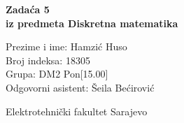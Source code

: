 \documentclass[12pt]{article}
\newcommand{\prezimeIme}{Hamzić Huso}
\newcommand{\brIndexa}{18305}
\newcommand{\brZadace}{5}
\newcommand{\grupa}{DM2 Pon[15.00]}
\newcommand{\demos}{Šeila Bećirović}
\begin{document}
    
    \thispagestyle{empty}
    \begin{center}
      \vspace*{1cm}

      \vspace*{2cm}
      {\huge \bf Zadaća \brZadace } \\
      \vspace*{1cm}
      {\Large \bf iz predmeta Diskretna matematika}

      \vspace*{2cm}

      {\Large Prezime i ime: \prezimeIme} \\
      \vspace*{0.75cm}
      {\Large Broj indeksa: \brIndexa} \\
      \vspace*{0.75cm}
      {\Large Grupa: \grupa} \\
      \vspace*{0.75cm}
      {\Large Odgovorni asistent: \demos} \\
      \vspace*{2cm}
      \renewcommand{\arraystretch}{1.75}
      \vfill


      {\large Elektrotehnički fakultet Sarajevo}

    \end{center}
    \newpage
    \thispagestyle{empty}
    
\end{document}
